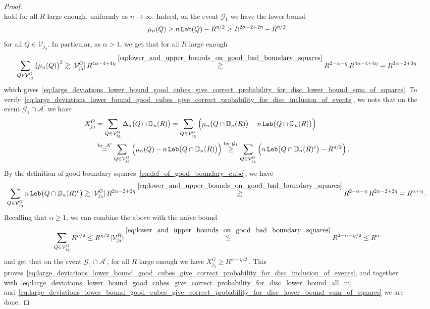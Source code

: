 \documentclass[11pt]{amsart}
\theoremstyle{definition}
\theoremstyle{remark}
\numberwithin{equation}{section}
\newcommand{\bD}{\mathbb D}
\begin{document}
\begin{proof}
\begin{equation}
		\end{equation}
		hold for all $R$ large enough, uniformly as $n\to \infty$. Indeed, on the event $\mathcal{G}_1$ we have the lower bound
		\begin{equation*}
			\mu_n(Q) \ge n \, {\tt Leb} (Q) - R^{\eta/2} \ge R^{2\alpha-2+2\eta} - R^{\eta/2}
		\end{equation*}
		for all $Q\in \mathcal{V}_{j_3}$. In particular, as $\alpha>1$, we get that for all $R$ large enough
		\[
		\sum_{Q\in \mathcal{V}_{j_3}^{G}}\big(\mu_n(Q)\big)^2 \gtrsim |\mathcal{V}_{j_3}^{G}| \, R^{4\alpha-4 + 4\eta} \stackrel{\eqref{eq:lower_and_upper_bounds_on_good_bad_boundary_squares}}{\gtrsim} R^{2-\alpha-\eta} \, R^{4\alpha-4 + 4\eta} = R^{3\alpha-2 + 3\eta}
		\]
		which gives~\eqref{eq:large_deviations_lower_bound_good_cubes_give_correct_probability_for_disc_lower_bound_sum_of_squares}. To verify~\eqref{eq:large_deviations_lower_bound_good_cubes_give_correct_probability_for_disc_inclusion_of_events}, we note that on the event $\mathcal{G}_1 \cap \mathcal{A}^\prime$ we have
		\begin{align*}
			X_{j_3}^G & = \sum_{Q\in \mathcal{V}_{j_3}^{G}} \Delta_{n}\big(Q\cap \bD_n(R)\big) = \sum_{Q\in \mathcal{V}_{j_3}^{G}} \Big(\mu_{n}\big(Q\cap \bD_n(R)\big) - n \, {\tt Leb}\big(Q\cap \bD_n(R)\big)\Big) \\ &\stackrel{\text{by}~\mathcal{A}^\prime}{=} \sum_{Q\in \mathcal{V}_{j_3}^{G}} \Big(\mu_{n}(Q) - n \, {\tt Leb}\big(Q\cap \bD_n(R)\big)\Big) \stackrel{{\text{by}~\mathcal{G}_1}}{\ge} \sum_{Q\in \mathcal{V}_{j_3}^{G}} \Big( n \, {\tt Leb}\big(Q\cap \bD_n(R)^{c}\big) - R^{\eta/2}\Big) \, .
		\end{align*}
		By the definition of good boundary squares~\eqref{eq:def_of_good_boundary_cube}, we have
		\[
		\sum_{Q\in \mathcal{V}_{j_3}^{G}} n \, {\tt Leb}\big(Q\cap \bD_n(R)^{c}\big) \gtrsim |\mathcal{V}_{j_3}^{G}| \, R^{2\alpha-2+2\eta} \stackrel{\eqref{eq:lower_and_upper_bounds_on_good_bad_boundary_squares}}{\gtrsim} R^{2-\alpha-\eta} \, R^{2\alpha-2+2\eta} = R^{\alpha+\eta} \, .
		\]
		Recalling that $\alpha\ge 1$, we can combine the above with the naive bound
		\[
		\sum_{Q\in \mathcal{V}_{j_3}^{G}} R^{\eta/2} \leq R^{\eta/2} \, |\mathcal{V}_{j_3}^B| \stackrel{\eqref{eq:lower_and_upper_bounds_on_good_bad_boundary_squares}}{\lesssim}  R^{2-\alpha - \eta/2} \le R^{\alpha}
		\]
		and get that on the event $\mathcal{G}_1 \cap \mathcal{A}^\prime$, for all $R$ large enough we have 
		$
		X_{j_3}^G \ge R^{\alpha+\eta/2}\, .
		$
		This proves~\eqref{eq:large_deviations_lower_bound_good_cubes_give_correct_probability_for_disc_inclusion_of_events}, and together with~\eqref{eq:large_deviations_lower_bound_good_cubes_give_correct_probability_for_disc_lower_bound_all_in} and~\eqref{eq:large_deviations_lower_bound_good_cubes_give_correct_probability_for_disc_lower_bound_sum_of_squares} we are done.
	\end{proof}
\end{document}
